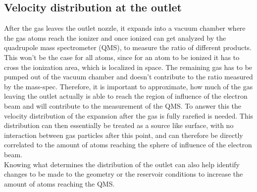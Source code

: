 \subsection{Velocity distribution at the outlet}

	After the gas leaves the outlet nozzle, it expands into a vacuum chamber where the gas atoms reach the ionizer and once ionized can get analyzed by the quadrupole mass spectrometer (QMS), to measure the ratio of different products.
	This won't be the case for all atoms, since for an atom to be ionized it has to cross the ionization area, which is localized in space.
	The remaining gas has to be pumped out of the vacuum chamber and doesn't contribute to the ratio measured by the mass-spec.
	Therefore, it is important to approximate, how much of the gas leaving the outlet actually is able to reach the region of influence of the electron beam and will contribute to the measurement of the QMS.
	To answer this the velocity distribution of the expansion after the gas is fully rarefied is needed.
	This distribution can then essentially be treated as a source like surface, with no interaction between gas particles after this point, and can therefore be directly correlated to the amount of atoms reaching the sphere of influence of the electron beam.\\
	Knowing what determines the distribution of the outlet can also help identify changes to be made to the geometry or the reservoir conditions to increase the amount of atoms reaching the QMS.
